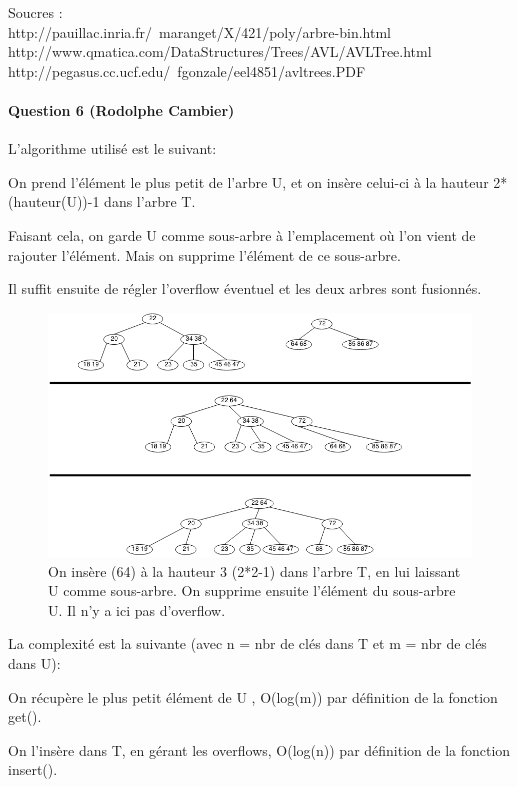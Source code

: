 \documentclass[a4paper]{article}
\begin{document}
{\footnotesize Soucres : \\
http://pauillac.inria.fr/~maranget/X/421/poly/arbre-bin.html\\
http://www.qmatica.com/DataStructures/Trees/AVL/AVLTree.html\\
http://pegasus.cc.ucf.edu/~fgonzale/eel4851/avltrees.PDF\\}

\paragraph*{Question 6 (Rodolphe Cambier)}


L'algorithme utilisé est le suivant:

On prend l'élément le plus petit de l'arbre U, et on insère celui-ci à la hauteur 2*(hauteur(U))-1 dans l'arbre T.

Faisant cela, on garde U comme sous-arbre à l'emplacement où l'on vient de rajouter l'élément. Mais on supprime l'élément de ce sous-arbre.

Il suffit ensuite de régler l'overflow éventuel et les deux arbres sont fusionnés.

\begin{figure}[H]
\centering
\includegraphics[scale=0.5]{algo.png}
\caption{On insère (64) à la hauteur 3 (2*2-1) dans l'arbre T, en lui laissant U comme sous-arbre. On supprime ensuite l'élément du sous-arbre U. Il n'y a ici pas d'overflow.}
\end{figure}

La complexité est la suivante (avec n = nbr de clés dans T et m = nbr de clés dans U):

On récupère le plus petit élément de U , O(log(m)) par définition de la fonction get().

On l'insère dans T, en gérant les overflows, O(log(n)) par définition de la fonction insert().
\end{document}
